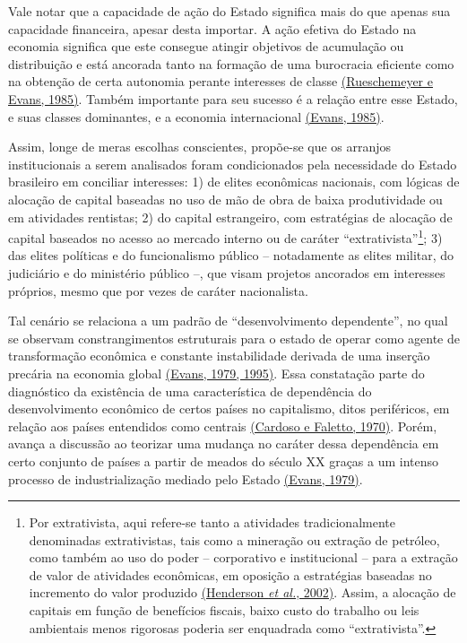 Vale notar que a capacidade de ação do Estado significa mais do que
apenas sua capacidade financeira, apesar desta importar. A ação efetiva
do Estado na economia significa que este consegue atingir objetivos de
acumulação ou distribuição e está ancorada tanto na formação de uma
burocracia eficiente como na obtenção de certa autonomia perante
interesses de classe
\href{https://www.zotero.org/google-docs/?CDUJIb}{(Rueschemeyer e Evans,
1985)}. Também importante para seu sucesso é a relação entre esse
Estado, e suas classes dominantes, e a economia internacional
\href{https://www.zotero.org/google-docs/?HtvVrw}{(Evans, 1985)}.

Assim, longe de meras escolhas conscientes, propõe-se que os arranjos
institucionais a serem analisados foram condicionados pela necessidade
do Estado brasileiro em conciliar interesses: 1) de elites econômicas
nacionais, com lógicas de alocação de capital baseadas no uso de mão de
obra de baixa produtividade ou em atividades rentistas; 2) do capital
estrangeiro, com estratégias de alocação de capital baseados no acesso
ao mercado interno ou de caráter ``extrativista''\footnote{Por
  extrativista, aqui refere-se tanto a atividades tradicionalmente
  denominadas extrativistas, tais como a mineração ou extração de
  petróleo, como também ao uso do poder -- corporativo e institucional
  -- para a extração de valor de atividades econômicas, em oposição a
  estratégias baseadas no incremento do valor produzido
  \href{https://www.zotero.org/google-docs/?GjG8Lj}{(Henderson \emph{et
  al.}, 2002)}. Assim, a alocação de capitais em função de benefícios
  fiscais, baixo custo do trabalho ou leis ambientais menos rigorosas
  poderia ser enquadrada como ``extrativista''.}; 3) das elites
políticas e do funcionalismo público -- notadamente as elites militar,
do judiciário e do ministério público --, que visam projetos ancorados
em interesses próprios, mesmo que por vezes de caráter nacionalista.

Tal cenário se relaciona a um padrão de ``desenvolvimento dependente'',
no qual se observam constrangimentos estruturais para o estado de operar
como agente de transformação econômica e constante instabilidade
derivada de uma inserção precária na economia global
\href{https://www.zotero.org/google-docs/?szdDtj}{(Evans, 1979, 1995)}.
Essa constatação parte do diagnóstico da existência de uma
característica de dependência do desenvolvimento econômico de certos
países no capitalismo, ditos periféricos, em relação aos países
entendidos como centrais
\href{https://www.zotero.org/google-docs/?8DVu6P}{(Cardoso e Faletto,
1970)}. Porém, avança a discussão ao teorizar uma mudança no caráter
dessa dependência em certo conjunto de países a partir de meados do
século XX graças a um intenso processo de industrialização mediado pelo
Estado \href{https://www.zotero.org/google-docs/?slaENo}{(Evans, 1979)}.

